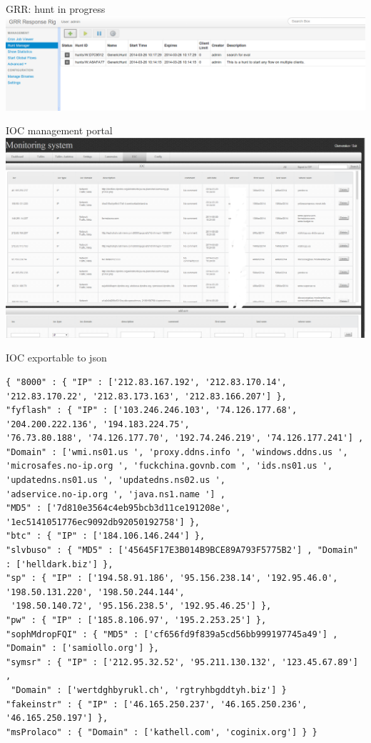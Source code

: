 \documentclass[presentation,smaller]{beamer}
\begin{document}
\begin{frame}[label=sec-7-11]{GRR: hunt in progress}
\includegraphics[width=.9\linewidth]{images/grr05.png}
\end{frame}
\begin{frame}[label=sec-7-12]{IOC management portal}
\includegraphics[width=14cm]{images/ioc01.png}
\end{frame}

\begin{frame}[fragile,label=sec-7-13]{IOC exportable to json}
 \tiny
\lstset{language=C,numbers=none}
\begin{lstlisting}
{ "8000" : { "IP" : ['212.83.167.192', '212.83.170.14', '212.83.170.22', '212.83.173.163', '212.83.166.207'] },
"fyflash" : { "IP" : ['103.246.246.103', '74.126.177.68', '204.200.222.136', '194.183.224.75', 
'76.73.80.188', '74.126.177.70', '192.74.246.219', '74.126.177.241'] , 
"Domain" : ['wmi.ns01.us ', 'proxy.ddns.info ', 'windows.ddns.us ', 
'microsafes.no-ip.org ', 'fuckchina.govnb.com ', 'ids.ns01.us ', 
'updatedns.ns01.us ', 'updatedns.ns02.us ', 
'adservice.no-ip.org ', 'java.ns1.name '] , 
"MD5" : ['7d810e3564c4eb95bcb3d11ce191208e', '1ec5141051776ec9092db92050192758'] },
"btc" : { "IP" : ['184.106.146.244'] },
"slvbuso" : { "MD5" : ['45645F17E3B014B9BCE89A793F5775B2'] , "Domain" : ['helldark.biz'] },
"sp" : { "IP" : ['194.58.91.186', '95.156.238.14', '192.95.46.0', '198.50.131.220', '198.50.244.144',
 '198.50.140.72', '95.156.238.5', '192.95.46.25'] },
"pw" : { "IP" : ['185.8.106.97', '195.2.253.25'] },
"sophMdropFQI" : { "MD5" : ['cf656fd9f839a5cd56bb999197745a49'] , "Domain" : ['samiollo.org'] },
"symsr" : { "IP" : ['212.95.32.52', '95.211.130.132', '123.45.67.89'] ,
 "Domain" : ['wertdghbyrukl.ch', 'rgtryhbgddtyh.biz'] } 
"fakeinstr" : { "IP" : ['46.165.250.237', '46.165.250.236', '46.165.250.197'] },
"msProlaco" : { "Domain" : ['kathell.com', 'coginix.org'] } }
\end{lstlisting}
\normalsize
\end{frame}
\end{document}
